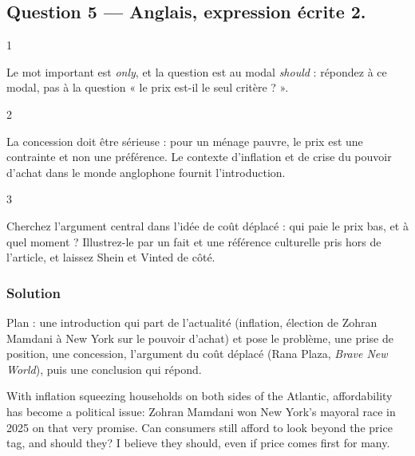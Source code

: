\documentclass[11pt,a4paper]{article}
\begin{document}
\hypertarget{question-5-anglais-expression-uxe9crite-2.}{%
\subsection{Question 5 --- Anglais, expression écrite 2.}\label{question-5-anglais-expression-uxe9crite-2.}}

\begin{indication}{1}

Le mot important est \emph{only}, et la question est au modal \emph{should} : répondez à ce modal, pas à la question « le prix est-il le seul critère ? ».

\end{indication}

\begin{indication}{2}

La concession doit être sérieuse : pour un ménage pauvre, le prix est une contrainte et non une préférence. Le contexte d'inflation et de crise du pouvoir d'achat dans le monde anglophone fournit l'introduction.

\end{indication}

\begin{indication}{3}

Cherchez l'argument central dans l'idée de coût déplacé : qui paie le prix bas, et à quel moment ? Illustrez-le par un fait et une référence culturelle pris hors de l'article, et laissez Shein et Vinted de côté.

\end{indication}

\hypertarget{solution-4}{%
\subsubsection{Solution}\label{solution-4}}

Plan : une introduction qui part de l'actualité (inflation, élection de Zohran Mamdani à New York sur le pouvoir d'achat) et pose le problème, une prise de position, une concession, l'argument du coût déplacé (Rana Plaza, \emph{Brave New World}), puis une conclusion qui répond.

With inflation squeezing households on both sides of the Atlantic, affordability has become a political issue: Zohran Mamdani won New York's mayoral race in 2025 on that very promise. Can consumers still afford to look beyond the price tag, and should they? I believe they should, even if price comes first for many.
\end{document}
